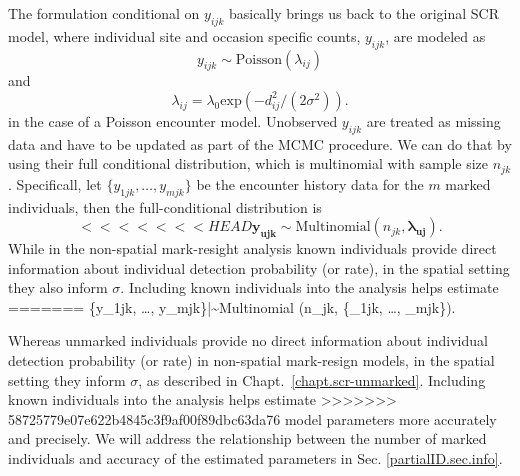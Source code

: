 The formulation conditional on $y_{ijk}$ basically brings us back to
the original SCR model, where individual site and occasion specific
counts, $y_{ijk}$, are modeled as
\[
y_{ijk} \sim \mbox{Poisson}(\lambda _{ij})
\]
and
\[
\lambda _{ij} = \lambda_0  \mbox{exp}(-d_{ij}^2/(2 \sigma^2)).
\]
in the case of a Poisson encounter model.
Unobserved $y_{ijk}$ are treated as missing data and have to be
updated as part of the MCMC procedure. We can do that by using their
full conditional distribution, which is multinomial with sample size
$n_{jk}$.
Specificall, let $\{y_{1jk}, \ldots, y_{mjk}\}$ be the encounter history data for
the $m$ marked individuals, then the full-conditional distribution is
\[
<<<<<<< HEAD
\mathbf{y_{ujk}} \sim \mbox{Multinomial} (n_{jk}, \mathbf{\lambda_{uj}}).
\]
While in the non-spatial mark-resight analysis known individuals
provide direct information about individual detection probability (or
rate), in the spatial setting they also inform
$\sigma$. Including known individuals into the analysis helps estimate
=======
\{y_{1jk}, \ldots, y_{mjk}\}|\cdot \sim \mbox{Multinomial} (n_{jk}, \{\lambda_{1jk}, \ldots, \lambda_{mjk}\}).
\]

Whereas unmarked individuals %
provide no direct information about individual detection probability (or
rate) in non-spatial mark-resign models, in the spatial setting they
inform $\sigma$, as described in
Chapt.~\ref{chapt.scr-unmarked}. Including known individuals into the
analysis helps estimate
>>>>>>> 58725779e07e622b4845c3f9af00f89dbc63da76
model parameters more accurately and precisely. We will address the
relationship between the number of marked individuals and accuracy of
the estimated parameters in Sec. \ref{partialID.sec.info}.


